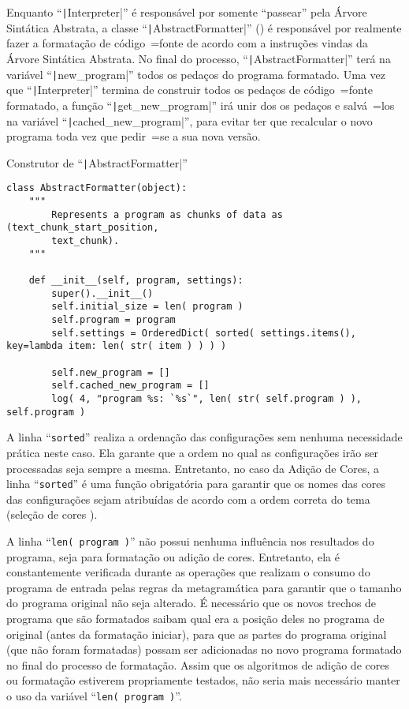 Enquanto ``\texttt|Interpreter|'' é responsável por somente ``passear'' pela Árvore Sintática Abstrata,
a classe ``\texttt|AbstractFormatter|'' () é responsável por realmente fazer a formatação de código~=fonte de acordo com a instruções vindas da Árvore Sintática Abstrata.
No final do processo,
``\texttt|AbstractFormatter|'' terá na variável ``\texttt|new_program|'' todos os pedaços do programa formatado.
Uma vez que ``\texttt|Interpreter|'' termina de construir todos os pedaços de código~=fonte formatado,
a função ``\texttt|get_new_program|'' irá unir dos os pedaços e
salvá~=los na variável ``\texttt|cached_new_program|'',
para evitar ter que recalcular o novo programa toda vez que pedir~=se a sua nova versão.
\begin{code}
\caption[Construtor de ``AbstractFormatter'']{Construtor de ``\texttt|AbstractFormatter|''}
\label{code:construtorDeParsedProgram}
\begin{verbatim}
class AbstractFormatter(object):
    """
        Represents a program as chunks of data as (text_chunk_start_position,
        text_chunk).
    """

    def __init__(self, program, settings):
        super().__init__()
        self.initial_size = len( program )
        self.program = program
        self.settings = OrderedDict( sorted( settings.items(), key=lambda item: len( str( item ) ) ) )

        self.new_program = []
        self.cached_new_program = []
        log( 4, "program %s: `%s`", len( str( self.program ) ), self.program )
\end{verbatim}
\end{code}

A linha ``\texttt{sorted}'' realiza a ordenação das configurações sem nenhuma necessidade prática neste caso.
Ela garante que a ordem no qual as configurações irão ser processadas seja sempre a mesma.
Entretanto,
no caso da Adição de Cores,
a linha ``\texttt{sorted}'' é uma função obrigatória para garantir que os nomes das cores das configurações sejam atribuídas de acordo com a ordem correta do tema (seleção de cores \cite{vsCodeSyntaxHighlighthing,sublimeTextScopeNaming}).

A linha ``\texttt{len( program )}'' não possui nenhuma influência nos resultados do programa,
seja para formatação ou
adição de cores.
Entretanto,
ela é constantemente verificada durante as operações que realizam o consumo do programa de entrada pelas regras da metagramática para garantir que o tamanho do programa original não seja alterado.
É necessário que os novos trechos de programa que são formatados saibam qual era a posição deles no programa de original (antes da formatação iniciar),
para que as partes do programa original (que não foram formatadas) possam ser adicionadas no novo programa formatado no final do processo de formatação.
Assim que os algoritmos de adição de cores ou
formatação estiverem propriamente testados,
não seria mais necessário manter o uso da variável ``\texttt{len( program )}''.

